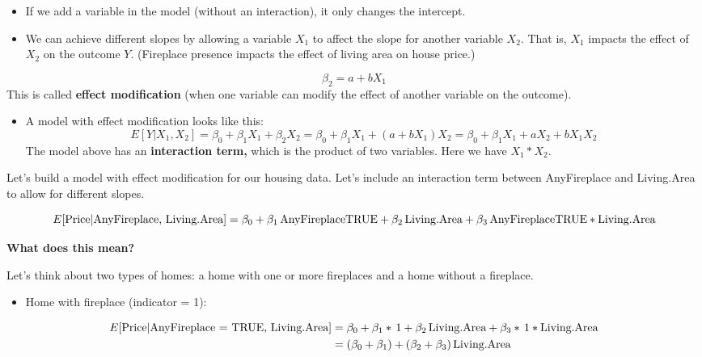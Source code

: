 \documentclass[
]{book}
\providecommand{\tightlist}{%
  \setlength{\itemsep}{0pt}\setlength{\parskip}{0pt}}
\begin{document}
\begin{itemize}
\item
  If we add a variable in the model (without an interaction), it only changes the intercept.
\item
  We can achieve different slopes by allowing a variable \(X_1\) to affect the slope for another variable \(X_2\). That is, \(X_1\) impacts the effect of \(X_2\) on the outcome \(Y\). (Fireplace presence impacts the effect of living area on house price.)
\end{itemize}

\[\beta_2 = a + bX_1\]
This is called \textbf{effect modification} (when one variable can modify the effect of another variable on the outcome).

\begin{itemize}
\tightlist
\item
  A model with effect modification looks like this:
  \[E[Y | X_1, X_2] = \beta_0 + \beta_1X_{1} + \beta_2X_{2}= \beta_0 + \beta_1X_{1} + (a+bX_1)X_{2}= \beta_0 + \beta_1X_{1} +aX_2+bX_1X_{2}\]
  The model above has an \textbf{interaction term,} which is the product of two variables. Here we have \(X_1*X_2\).
\end{itemize}

Let's build a model with effect modification for our housing data. Let's include an interaction term between AnyFireplace and Living.Area to allow for different slopes.

\[E[\hbox{Price}| \hbox{AnyFireplace, Living.Area}] = \beta_0+ \beta_1\,\hbox{AnyFireplaceTRUE} + \beta_2\,\hbox{Living.Area}+ \beta_3\,\hbox{AnyFireplaceTRUE}*\hbox{Living.Area}\]

\textbf{What does this mean?}

Let's think about two types of homes: a home with one or more fireplaces and a home without a fireplace.

\begin{itemize}
\tightlist
\item
  Home with fireplace (indicator = 1):
\end{itemize}

\begin{align*}
E[\hbox{Price}| \hbox{AnyFireplace = TRUE, Living.Area}] &= \beta_0 + \beta_1*\,1 + \beta_2\,\hbox{Living.Area}+ \beta_3*\,1*\hbox{Living.Area}\\
&= (\beta_0 + \beta_1) + (\beta_2+\beta_3)\,\hbox{Living.Area}\\
\end{align*}
\end{document}
